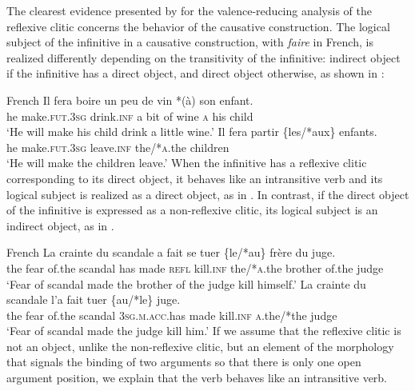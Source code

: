 \documentclass[output=paper,hidelinks]{langscibook}
\begin{document}
\newpage

The clearest evidence presented by \citet{Grimshaw1982,Grimshaw90} for the valence-reducing analysis of the reflexive clitic concerns the behavior of the causative construction. The logical subject of the infinitive in a causative construction, with \textit{faire} in French, is realized differently depending on the transitivity of the infinitive: indirect object if the infinitive has a direct object, and direct object otherwise, as shown in :

\ea\label{ex:Romance:22} French \citep[153]{Grimshaw90}
\ea\label{ex:Romance:22a}
\gll
Il fera boire un peu de vin *(à) son enfant.\\
he make.\textsc{fut.3sg} drink.\textsc{inf} a bit of wine \textsc{a} his child\\
\glt   `He will make his child drink a little wine.'
\ex\label{ex:Romance:22b}
\gll
Il fera partir \{les/*aux\} enfants.\\
he make.\textsc{fut.3sg} leave.\textsc{inf} the/*\textsc{a}.the children\\
\glt   `He will make the children leave.'
\z\z
When the infinitive has a reflexive clitic corresponding to its direct object, it behaves like an intransitive verb and its logical subject is realized as a direct object, as in . In contrast, if the direct object of the infinitive is expressed as a non-reflexive clitic, its logical subject is an indirect object, as in .

\ea\label{ex:Romance:23} French  \citep[153]{Grimshaw90}
\ea\label{ex:Romance:23a}
\gll
La crainte du scandale a fait se tuer \{le/*au\} frère du juge.\\
       the fear of.the scandal has made \textsc{refl} kill.\textsc{inf} the/*\textsc{a}.the brother of.the judge\\
\glt   `Fear of scandal made the brother of the judge kill himself.'
\ex\label{ex:Romance:23b}
\gll
La crainte du scandale l'a fait tuer \{au/*le\} juge.\\
       the fear of.the scandal 3\textsc{sg.m.acc}.has made kill.\textsc{inf} \textsc{a}.the/*the judge\\
\glt   `Fear of scandal made the judge kill him.'
\z\z
If we assume that the reflexive clitic is not an object, unlike the non-reflexive clitic, but an element of the morphology that signals the binding of two arguments so that there is only one open argument position, we explain that the verb behaves like an intransitive verb.
\end{document}
